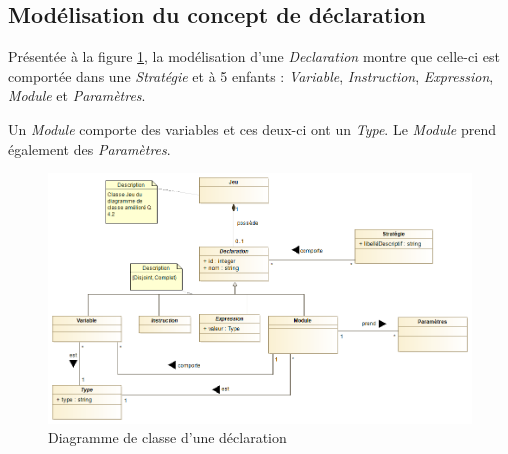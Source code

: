 
\subsection{Modélisation du concept de déclaration}
\label{sec:question9}

Présentée à la figure \ref{fig:declaration}, la modélisation d'une \emph{Declaration} montre que celle-ci est comportée dans une \emph{Stratégie} et à 5 enfants : \emph{Variable}, \emph{Instruction}, \emph{Expression}, \emph{Module} et \emph{Paramètres}.

Un \emph{Module} comporte des variables et ces deux-ci ont un \emph{Type}. Le \emph{Module} prend également des \emph{Paramètres}.

\begin{figure}[h!]
	\centering
	\includegraphics[width=450pt]{assets/class__Declaration}
	\caption{Diagramme de classe d'une déclaration}
	\label{fig:declaration}
\end{figure}
